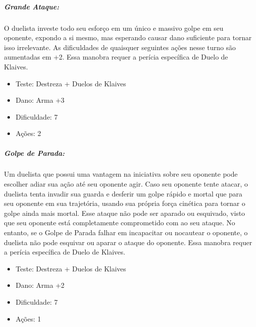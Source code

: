 \subparagraph{\bf Grande Ataque:} O duelista investe todo seu esforço em um único e massivo golpe em seu oponente, expondo a si mesmo, mas esperando causar dano suficiente para tornar isso irrelevante. As dificuldades de quaisquer seguintes ações nesse turno são aumentadas em +2. Essa manobra requer a perícia específica de Duelo de Klaives.
\begin{itemize}[noitemsep]
\item Teste: Destreza + Duelos de Klaives
\item Dano: Arma +3
\item Dificuldade: 7 
\item Ações: 2
\end{itemize}

\subparagraph{\bf Golpe de Parada:} Um duelista que possui uma vantagem na iniciativa sobre seu oponente pode escolher adiar sua ação até seu oponente agir. Caso seu oponente tente atacar, o duelista tenta invadir sua guarda e desferir um golpe rápido e mortal que para seu oponente em sua trajetória, usando sua própria força cinética para tornar o golpe ainda mais mortal. Esse ataque não pode ser aparado ou esquivado, visto que seu oponente está completamente comprometido com ao seu ataque. No entanto, se o Golpe de Parada falhar em incapacitar ou nocautear o oponente, o duelista não pode esquivar ou aparar o ataque do oponente. Essa manobra requer a perícia específica de Duelo de Klaives.
\begin{itemize}[noitemsep]
\item Teste: Destreza + Duelos de Klaives
\item Dano: Arma +2
\item Dificuldade: 7 
\item Ações: 1
\end{itemize}